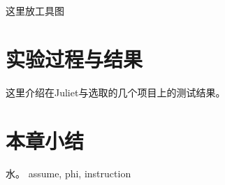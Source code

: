 这里放工具图

\section{实验过程与结果}

这里介绍在Juliet与选取的几个项目上的测试结果。

\section{本章小结}

水。
assume, phi, instruction


















































